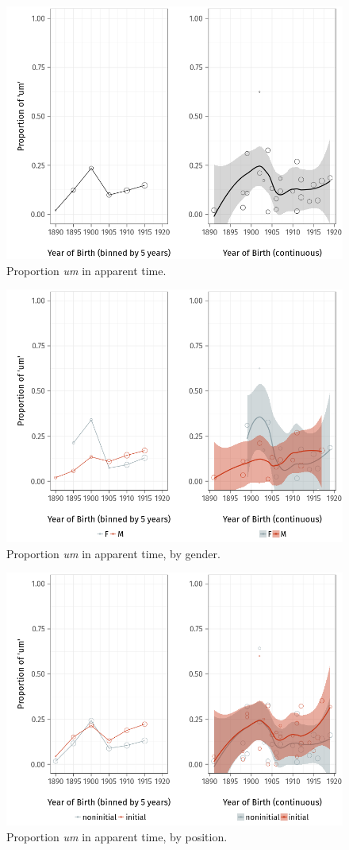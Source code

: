 \documentclass[11pt]{article}
\begin{document}
\begin{figure}[htpb]
    \centering
    \includegraphics[width=0.8\linewidth]{figures/apparenttime.png}
    \caption{Proportion \emph{um} in apparent time.}
    \label{fig:apparenttime}
\end{figure}

\begin{figure}[htpb]
    \centering
    \includegraphics[width=0.8\linewidth]{figures/apparentgender.png}
    \caption{Proportion \emph{um} in apparent time, by gender.}
    \label{fig:apparentgender}
\end{figure}

\begin{figure}[htpb]
    \centering
    \includegraphics[width=0.8\linewidth]{figures/apparentposition.png}
    \caption{Proportion \emph{um} in apparent time, by position.}
    \label{fig:apparentposition}
\end{figure}
\end{document}

